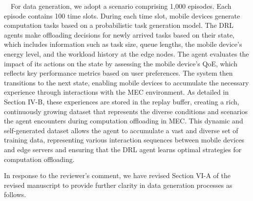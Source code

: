 \documentclass[12pt,draftclsnofoot,onecolumn]{IEEEtran}
\newcommand{\rev}[1]{{\color{blue}#1}} %
\newcommand{\rev}[1]{#1}
\newenvironment{my}[2]%
{\begin{list}{}%
{\setlength{\rightmargin}{#1}\setlength{\leftmargin}{#2}}%


 \item[]{}

} {\end{list}}
\begin{document}
\begin{enumerate}





\,\,\,\, For data generation, we adopt a scenario comprising 1,000 episodes. Each episode contains 100 time slots. During each time slot, mobile devices generate computation tasks based on a probabilistic task generation model. The DRL agents make offloading decisions for newly arrived tasks based on their state, which includes information such as task size, queue lengths, the mobile device’s energy level, and the workload history at the edge nodes. The agent evaluates the impact of its actions on the state by assessing the mobile device's QoE, which reflects key performance metrics based on user preferences. The system then transitions to the next state, enabling mobile devices to accumulate the necessary experience through interactions with the MEC environment. As detailed in Section IV-B, these experiences are stored in the replay buffer, creating a rich, continuously growing dataset that represents the diverse conditions and scenarios the agent encounters during computation offloading in MEC. This dynamic and self-generated dataset allows the agent to accumulate a vast and diverse set of training data, representing various interaction sequences between mobile devices and edge servers and ensuring that the DRL agent learns optimal strategies for computation offloading.\vspace{2mm}


In response to the reviewer’s comment, we have revised Section VI-A of the revised manuscript to provide further clarity in data generation processes as follows.

\setcounter{subsection}{0}
\setcounter{table}{0}
		\begin{my}{1cm}{1cm}
	\rev{
		{\ 
			
			\dots \color{black} \vspace{-4mm}
			
}}
\end{my}
\end{enumerate}
\end{document}
